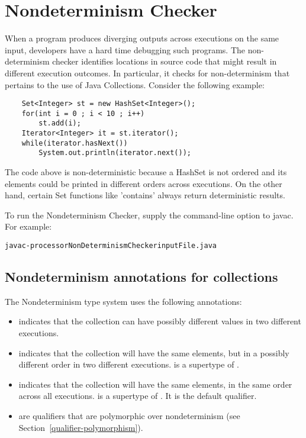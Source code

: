 \htmlhr
\chapter{Nondeterminism Checker\label{nondeterminism-checker}}
When a program produces diverging outputs across executions on the same input, developers
have a hard time debugging such programs.
The non-determinism checker identifies locations in source code that might result in different execution outcomes.
In particular, it checks for non-determinism that pertains to the use of Java Collections.
Consider the following example:
\begin{Verbatim}
	Set<Integer> st = new HashSet<Integer>();
	for(int i = 0 ; i < 10 ; i++)
	    st.add(i);
	Iterator<Integer> it = st.iterator();
	while(iterator.hasNext())
	    System.out.println(iterator.next());

\end{Verbatim}

The code above is non-deterministic because a HashSet is not ordered and its elements could be printed in different orders across executions.
On the other hand, certain Set functions like 'contains' always return deterministic results.

To run the Nondeterminism Checker, supply the
command-line option to javac.
For example:

\begin{alltt}
	javac -processor NonDeterminismChecker inputFile.java
\end{alltt}


\section{Nondeterminism annotations for collections\label{nondeterminism-annotations-collections}}

The Nondeterminism type system uses the following annotations:
\begin{itemize}
\item
   indicates
  that the collection can have possibly different values in two different executions.
\item
   indicates that
  the collection will have the same elements, but in a possibly different order in two different executions.
   is a supertype of .
 \item
   indicates that
  the collection will have the same elements, in the same order across all executions.
   is a supertype of .
   It is the default qualifier.
\item
   are qualifiers that are
  polymorphic over nondeterminism (see Section~\ref{qualifier-polymorphism}).
\end{itemize}

